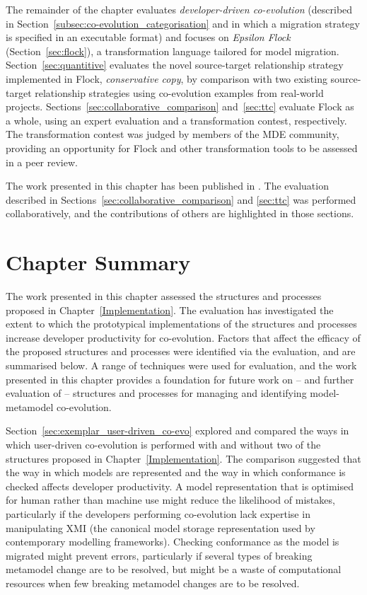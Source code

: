 The remainder of the chapter evaluates \emph{developer-driven co-evolution} (described in Section~\ref{subsec:co-evolution_categorisation} and in which a migration strategy is specified in an executable format) and focuses on \emph{Epsilon Flock} (Section~\ref{sec:flock}), a transformation language tailored for model migration. Section~\ref{sec:quantitive} evaluates the novel source-target relationship strategy implemented in Flock, \emph{conservative copy}, by comparison with two existing source-target relationship strategies using co-evolution examples from real-world projects. Sections~\ref{sec:collaborative_comparison} and~\ref{sec:ttc} evaluate Flock as a whole, using an expert evaluation and a transformation contest, respectively. The transformation contest was judged by members of the MDE community, providing an opportunity for Flock and other transformation tools to be assessed in a peer review.

The work presented in this chapter has been published in \cite{rose10comparison,rose10ttc_solution,rose10ttc_case}. The evaluation described in Sections~\ref{sec:collaborative_comparison} and \ref{sec:ttc} was performed collaboratively, and the contributions of others are highlighted in those sections.








\section{Chapter Summary}
The work presented in this chapter assessed the structures and processes proposed in Chapter~\ref{Implementation}. The evaluation has investigated the extent to which the prototypical implementations of the structures and processes increase developer productivity for co-evolution. Factors that affect the efficacy of the proposed structures and processes were identified via the evaluation, and are summarised below. A range of techniques were used for evaluation, and the work presented in this chapter provides a foundation for future work on -- and further evaluation of -- structures and processes for managing and identifying model-metamodel co-evolution.

Section~\ref{sec:exemplar_user-driven_co-evo} explored and compared the ways in which user-driven co-evolution is performed with and without two of the structures proposed in Chapter~\ref{Implementation}. The comparison suggested that the way in which models are represented and the way in which conformance is checked affects developer productivity. A model representation that is optimised for human rather than machine use might reduce the likelihood of mistakes, particularly if the developers performing co-evolution lack expertise in manipulating XMI (the canonical model storage representation used by contemporary modelling frameworks). Checking conformance as the model is migrated might prevent errors, particularly if several types of breaking metamodel change are to be resolved, but might be a waste of computational resources when few breaking metamodel changes are to be resolved.

